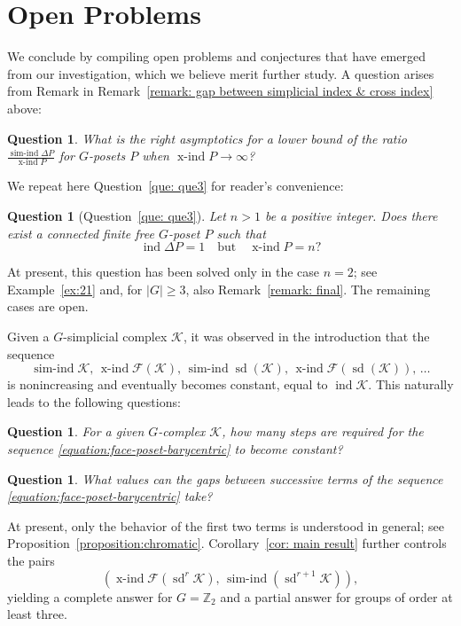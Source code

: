 \documentclass[preprint,12pt]{article}
\renewcommand{\ge}{\geqslant}
\newtheorem{question}[theorem]{Question}
\newtheorem*{question*}{Question}
\theoremstyle{definition}
\theoremstyle{remark}
\numberwithin{equation}{section}
\DeclareMathOperator{\ind}{ind}
\DeclareMathOperator{\xind}{x-ind}
\DeclareMathOperator{\sind}{sim-ind}
\DeclareMathOperator{\sd}{sd}
\begin{document}
\section{Open Problems}

We conclude by compiling open problems and conjectures that have emerged from our investigation, which we believe merit further study. A question arises from Remark in Remark~\ref{remark: gap between simplicial index & cross index} above:

\begin{question}
What is the right asymptotics for a lower bound of the ratio \(\frac{\sind \Delta P}{\xind P}\) for $G$-posets $P$ when \(\xind P\to \infty\)?
\end{question}

We repeat here Question~\ref{que: que3} for reader's convenience:

\begin{question*}[Question~\ref{que: que3}]
Let \( n > 1 \) be a positive integer. Does there exist a connected finite free \( G \)-poset \( P \) such that
\[
\ind \Delta P = 1 \quad \text{but} \quad \xind P = n?
\]
\end{question*}

At present, this question has been solved only in the case \(n=2\); see Example~\ref{ex:21} and, for \(|G|\ge 3\), also Remark~\ref{remark: final}. The remaining cases are open.

Given a $G$-simplicial complex $\mathcal{K}$, it was observed in the introduction that the sequence
\begin{equation}
\label{equation:face-poset-barycentric}
 \sind\mathcal{K},\, \xind \mathcal{F}(\mathcal{K}),\, \sind \sd(\mathcal{K}),\, \xind \mathcal{F}(\sd(\mathcal{K})),\, \dotsc   
\end{equation}
is nonincreasing and eventually becomes constant, equal to $\ind \mathcal{K}$. This naturally leads to the following questions:

\begin{question}
\label{que:index_gap_stabilization}
For a given $G$-complex $\mathcal{K}$, how many steps are required for the sequence \eqref{equation:face-poset-barycentric} to become constant?
\end{question}
\begin{question}
\label{que:index_gap_values}
What values can the gaps between successive terms of the sequence \eqref{equation:face-poset-barycentric} take?
\end{question}
At present, only the behavior of the first two terms is understood in general; see Proposition~\ref{proposition:chromatic}. Corollary~\ref{cor: main result} further controls the pairs
\[
(\xind \mathcal F(\sd^r\mathcal K),\, \sind(\sd^{r+1}\mathcal K)),
\]
yielding a complete answer for \(G=\mathbb Z_2\) and a partial answer for groups of order at least three. 
\end{document}
